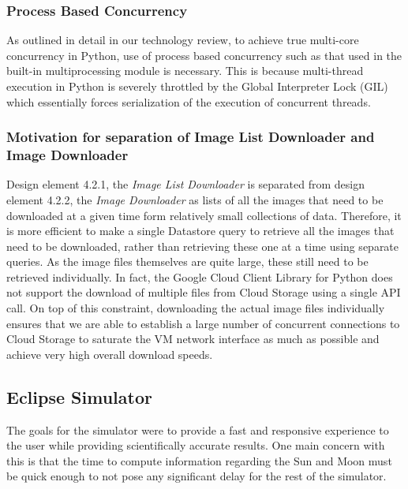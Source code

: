 \documentclass[10pt, onecolumn, draftclsnofoot, letterpaper, compsoc]{IEEEtran}
\begin{document}
    \subsubsection{Process Based Concurrency}
    As outlined in detail in our technology review, to achieve true multi-core concurrency in Python, use of 
    process based concurrency such as that used in the built-in multiprocessing module is necessary. This is 
    because multi-thread execution in Python is severely throttled by the Global Interpreter Lock (GIL) which 
    essentially forces serialization of the execution of concurrent threads. \\

    \subsubsection{Motivation for separation of Image List Downloader and Image Downloader}
    Design element 4.2.1, the \textit{Image List Downloader} is separated from design element 4.2.2, the 
    \textit{Image Downloader} as lists of all the images that need to be downloaded at a given time form 
    relatively small collections of data. Therefore, it is more efficient to make a single Datastore query to 
    retrieve all the images that need to be downloaded, rather than retrieving these one at a time using 
    separate queries. As the image files themselves are quite large, these still need to be retrieved 
    individually. In fact, the Google Cloud Client Library for Python does not support the download of multiple 
    files from Cloud Storage using a single API call. On top of this constraint, downloading the actual image 
    files individually ensures that we are able to establish a large number of concurrent connections to Cloud 
    Storage to saturate the VM network interface as much as possible and achieve very high overall download 
    speeds. \\

\subsection{Eclipse Simulator}


The goals for the simulator were to provide a fast and
responsive experience to the user while providing
scientifically accurate results. One main concern with this
is that the time to compute information regarding the Sun
and Moon must be quick enough to not pose any significant
delay for the rest of the simulator. \\
\end{document}
